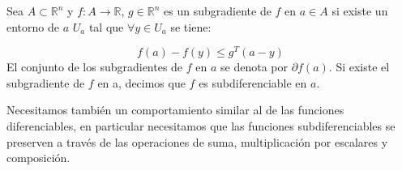\begin{definicion}[Subgradiente]
     Sea $A \subset \mathbb{R}^n$ y $f:A \rightarrow \mathbb{R}$, $g \in \mathbb{R}^n$ es un subgradiente de $f$ en $a \in A$ si existe un entorno de $a$ $U_a$ tal que $\forall y \in U_a$ se tiene:

    $$f(a)-f(y) \leq g^T(a-y)$$
    El conjunto de los subgradientes de $f$ en $a$ se denota por $\partial f(a)$. Si existe el subgradiente de $f$ en a, decimos que $f$ es subdiferenciable en $a$.
\end{definicion}

Necesitamos también un comportamiento similar al de las funciones diferenciables, en particular necesitamos que las funciones subdiferenciables se preserven a través de las operaciones de suma, multiplicación por escalares y composición.

